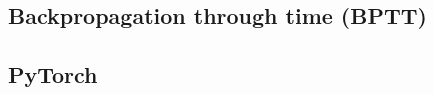  \subsection{Backpropagation through time (BPTT)} \label{subsection::bptt}
  
 \subsection{PyTorch} \label{subsection::pytorch}